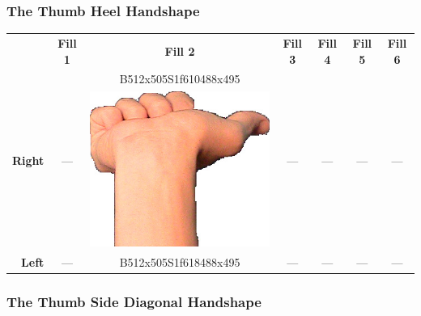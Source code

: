 \documentclass{article}
\begin{document}
\subsubsection{The Thumb Heel Handshape}

\begin{center}
\begin{tabular}{r*{6}{c}}
&\textbf{Fill 1}&\textbf{Fill 2}&\textbf{Fill 3}&\textbf{Fill 4}&\textbf{Fill 5}&\textbf{Fill 6}\\
\multirow{2}{*}{\textbf{Right}}&
\multirow{2}{*}{---}&
B512x505S1f610488x495&
\multirow{2}{*}{---}&
\multirow{2}{*}{---}&
\multirow{2}{*}{---}&
\multirow{2}{*}{---}\\
&
&
\includegraphics[scale=0.1]{images/10-02-2.jpg}\\
\textbf{Left}&
---&
B512x505S1f618488x495&
---&
---&
---&
---\\
\end{tabular}
\end{center}

\subsubsection{The Thumb Side Diagonal Handshape}
\end{document}
